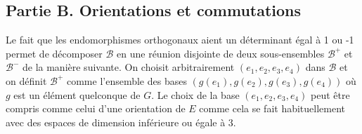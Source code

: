\subsection*{Partie B. Orientations et commutations}
Le fait que les endomorphismes orthogonaux aient un déterminant égal à 1 ou -1 permet de décomposer $\mathcal{B}$ en une réunion disjointe de deux sous-ensembles $\mathcal{B}^+$ et $\mathcal{B}^-$ de la manière suivante.\newline
On choisit arbitrairement $(e_1,e_2,e_3,e_4)$ dans $\mathcal{B}$ et on définit $\mathcal{B}^+$ comme l'ensemble des bases $(g(e_1),g(e_2),g(e_3),g(e_4))$ où $g$ est un élément quelconque de $G$.\newline
Le choix de la base $(e_1,e_2,e_3,e_4)$ peut être compris comme celui d'une orientation de $E$ comme cela se fait habituellement avec des espaces de dimension inférieure ou égale à 3.

